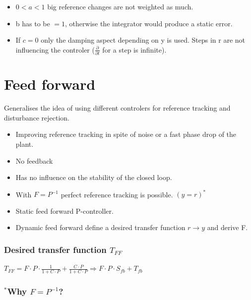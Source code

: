 \documentclass[10pt,a4paper]{scrartcl}
\begin{document}
\begin{multicols*}{3}
	\begin{itemize}
	\compaq
	\item $0<a<1$ \dahe big reference changes are not weighted as much.
	\item b has to be $=1$, otherwise the integrator would produce a static error.
	\item If $c=0$ only the damping aspect depending on y is used. Steps in r are not influencing the controler ($\frac{\partial}{\partial t}$ for a step is infinite).
	\end{itemize}
	
	\section{Feed forward}
	
	Generalises the idea of using different controlers for reference tracking and disturbance rejection.
	
	
	\begin{itemize}
	\compaq
	\item
	Improving reference tracking in spite of noise or a fast phase drop of the plant.
	\item
	No feedback
	\item
	Has no influence on the stability of the closed loop.
	\item
	With $F=P^{-1}$ perfect reference tracking is possible. $(y=r)^\ast$
	\item
	Static feed forward \dahe P-controller.
	\item
	Dynamic feed forward \dahe define a desired transfer function $r\rightarrow y$ and derive F.
	\end{itemize}
	
	
	
	\subsubsection*{Desired transfer function $T_{FF}$}
	
	$T_{FF}=F\cdot P\cdot \frac{1}{1+C\cdot P}+\frac{C\cdot P}{1+C\cdot P}\Rightarrow F\cdot P\cdot S_{fb}+T_{fb}$
	
	
	\subsubsection*{$^\ast$Why $F=P^{-1}$?}
	

\end{multicols*}
\end{document}
